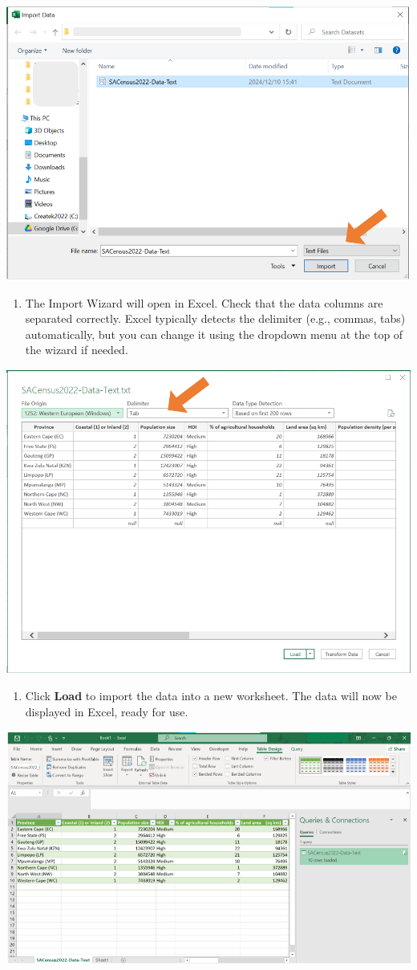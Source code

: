 \documentclass[
]{book}
\providecommand{\tightlist}{%
  \setlength{\itemsep}{0pt}\setlength{\parskip}{0pt}}
\begin{document}
\begin{center}\includegraphics[width=0.6\linewidth]{Figures/import_2} \end{center}

\begin{enumerate}
\def\labelenumi{\arabic{enumi}.}
\setcounter{enumi}{2}
\tightlist
\item
  The Import Wizard will open in Excel. Check that the data columns are separated correctly. Excel typically detects the delimiter (e.g., commas, tabs) automatically, but you can change it using the dropdown menu at the top of the wizard if needed.
\end{enumerate}

\begin{center}\includegraphics[width=0.7\linewidth]{Figures/import_3} \end{center}

\begin{enumerate}
\def\labelenumi{\arabic{enumi}.}
\setcounter{enumi}{3}
\tightlist
\item
  Click \textbf{Load} to import the data into a new worksheet. The data will now be displayed in Excel, ready for use.
\end{enumerate}

\begin{center}\includegraphics[width=0.7\linewidth]{Figures/import_4} \end{center}
\end{document}
